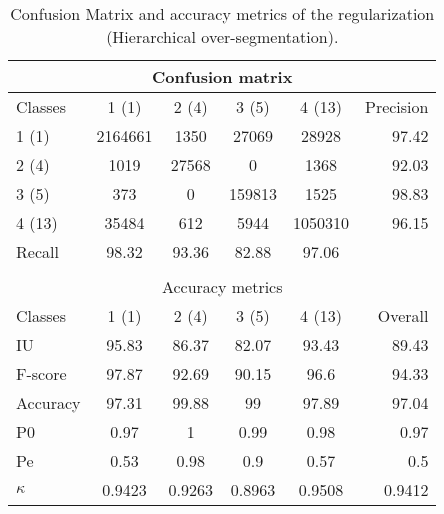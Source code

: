 \begin{table}[H]
\begin{center}
\footnotesize
\begin{tabular}{|l|c|c|c|c|r|}
\hline
\multicolumn{6}{|c|}{Confusion matrix} \\
\hline
 Classes & 1 (1) & 2 (4) & 3 (5) & 4 (13) & Precision \\
\hline
1 (1) & 2164661 & 1350 & 27069 & 28928 & 97.42 \\
\hline
2 (4) & 1019 & 27568 & 0 & 1368 & 92.03 \\
\hline
3 (5) & 373 & 0 & 159813 & 1525 & 98.83 \\
\hline
4 (13) & 35484 & 612 & 5944 & 1050310 & 96.15 \\
\hline
Recall & 98.32 & 93.36 & 82.88 & 97.06 &  \\
\hline
\multicolumn{6}{c}{ } \\
\hline
\multicolumn{6}{|c|}{Accuracy metrics} \\
\hline
 Classes & 1 (1) & 2 (4) & 3 (5) & 4 (13) & Overall \\
\hline
IU & 95.83 & 86.37 & 82.07 & 93.43 & 89.43 \\
\hline
F-score & 97.87 & 92.69 & 90.15 & 96.6 & 94.33 \\
\hline
Accuracy & 97.31 & 99.88 & 99 & 97.89 & 97.04 \\
\hline
P0 & 0.97 & 1 & 0.99 & 0.98 & 0.97 \\
\hline
Pe & 0.53 & 0.98 & 0.9 & 0.57 & 0.5 \\
\hline
$\kappa$ & 0.9423 & 0.9263 & 0.8963 & 0.9508 & 0.9412 \\
\hline
\end{tabular}
\caption{Confusion Matrix and accuracy metrics of the regularization (Hierarchical over-segmentation).}
\label{table:}
\end{center}
\end{table}
